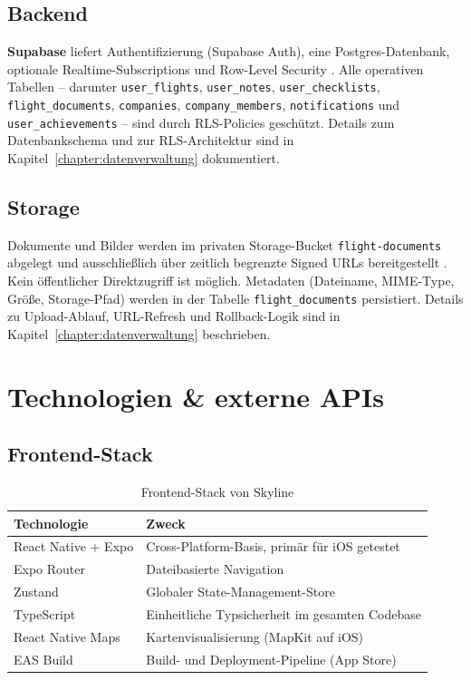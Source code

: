 \subsection{Backend}

\textbf{Supabase} liefert Authentifizierung (Supabase Auth), eine Postgres-Datenbank,
optionale Realtime-Subscriptions und Row-Level Security \cite{supabasePlatform,supabaseAuth,supabaseRLS}.
Alle operativen Tabellen -- darunter \texttt{user\_flights}, \texttt{user\_notes},
\texttt{user\_checklists}, \texttt{flight\_documents}, \texttt{companies},
\texttt{company\_members}, \texttt{notifications} und \texttt{user\_achievements} --
sind durch RLS-Policies geschützt. Details zum Datenbankschema
und zur RLS-Architektur sind in Kapitel~\ref{chapter:datenverwaltung} dokumentiert.

\subsection{Storage}

Dokumente und Bilder werden im privaten Storage-Bucket \texttt{flight-documents} abgelegt
und ausschließlich über zeitlich begrenzte Signed URLs bereitgestellt \cite{supabaseStorage}.
Kein öffentlicher Direktzugriff ist möglich. Metadaten (Dateiname, MIME-Type, Größe,
Storage-Pfad) werden in der Tabelle \texttt{flight\_documents} persistiert. Details zu
Upload-Ablauf, URL-Refresh und Rollback-Logik sind in Kapitel~\ref{chapter:datenverwaltung} beschrieben.

\section{Technologien \& externe APIs}

\subsection{Frontend-Stack}

\begin{table}[H]
  \centering
  \caption{Frontend-Stack von Skyline}
  \label{tab:frontend_stack}
  \begin{tabular}{p{4.2cm}p{8.5cm}}
  \toprule
  \textbf{Technologie} & \textbf{Zweck} \\
  \midrule
  React Native + Expo & Cross-Platform-Basis, primär für iOS getestet \cite{reactNative,expoDocs} \\
  Expo Router & Dateibasierte Navigation \\
  Zustand & Globaler State-Management-Store \\
  TypeScript & Einheitliche Typsicherheit im gesamten Codebase \\
  React Native Maps & Kartenvisualisierung (MapKit auf iOS) \cite{reactNativeMaps} \\
  EAS Build & Build- und Deployment-Pipeline (App Store) \cite{easBuild} \\
  \bottomrule
  \end{tabular}
\end{table}

